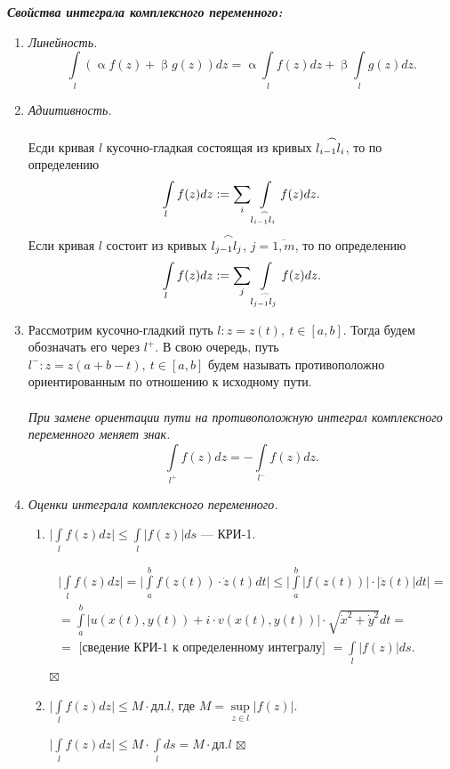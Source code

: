 \documentclass[a4paper, 12pt]{article}
\newenvironment{Proof} %
{\par\noindent{$\blacklozenge$}} %
{\hfill$\scriptstyle\boxtimes$}
\renewcommand{\leq}{\leqslant}
\renewcommand{\alpha}{\upalpha}
\renewcommand{\beta}{\upbeta}
\newcommand{\intab}{\int\limits_a^b}
\newcommand{\intl}{\int\limits_l}
\begin{document}
\textbf{\textit{Свойства интеграла комплексного переменного:}}\begin{enumerate}
	\item \textit{Линейность.}
	$$\int\limits_l (\alpha f(z) + \beta g(z))dz = \alpha \intl f(z)dz + \beta \intl g(z)dz.$$
	\item \textit{Адиитивность.}\\\\
	Есди кривая $l$ кусочно-гладкая состоящая из кривых $\buildrel\,\,\frown\over{l_{i-1}l_i}$, то по определению $$\intl f(z)dz := \sum\limits_i\int\limits_{\buildrel\,\,\frown\over{l_{i-1}l_i}}f(z)dz.$$
	Если кривая $l$ состоит из кривых $\buildrel\,\,\frown\over{l_{j-1}l_j}$, $j = \overline{1,m}$, то по определению $$\intl f(z)dz := \sum\limits_j\int\limits_{\buildrel\,\,\frown\over{l_{j-1}l_j}}f(z)dz.$$
	\item Рассмотрим кусочно-гладкий путь $l: z= z(t),\ t\in[a,b].$ Тогда будем обозначать его через $l^+$. В свою очередь, путь $l^-: z= z(a+b-t),\ t\in[a,b]$ будем называть противоположно ориентированным по отношению к исходному пути.\\\\
	\textit{При замене ориентации пути на противоположную интеграл комплексного переменного меняет знак.}
	$$\int\limits_{l^+}f(z)dz = -\int\limits_{l^-}f(z)dz.$$
	\item \textit{Оценки интеграла комплексного переменного.}\begin{enumerate}
		\item $\Big|\intl f(z)dz\Big|\leq \intl |f(z)|ds$ --- КРИ-1.
		\begin{Proof}
			\begin{multline*}
				\Big|\intl f(z)dz\Big| = \Big|\intab f(z(t))\cdot\dot z (t)dt\Big|\leq \Big|\intab |f(z(t))|\cdot |\dot z (t)|dt\Big| =\\= \intab |u(x(t),y(t)) + i \cdot v(x(t),y(t))|\cdot \sqrt{\dot x^2 + \dot y^2}dt=\\ =\text{ [сведение КРИ-1 к определенному интегралу] } = \intl|f(z)|ds.
			\end{multline*}
		\end{Proof}
	\item $\Big|\intl f(z)dz\Big|\leq M\cdot \text{дл.}l$, где $M=\underset{z\in l}{\sup}|f(z)|$.
	\begin{Proof}
		$\Big|\intl f(z)dz\Big|\leq M\cdot \intl ds = M\cdot \text{дл.}l$
	\end{Proof}
	\end{enumerate}
\end{enumerate}
\end{document}

